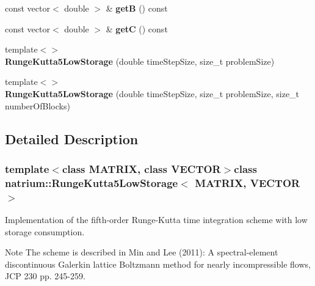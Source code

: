 \begin{DoxyCompactItemize}
\item 
\hypertarget{classnatrium_1_1RungeKutta5LowStorage_ac866c3f75f850ab90b70b3eaedd3cc3c}{const vector$<$ double $>$ \& {\bfseries get\-B} () const }\label{classnatrium_1_1RungeKutta5LowStorage_ac866c3f75f850ab90b70b3eaedd3cc3c}

\item 
\hypertarget{classnatrium_1_1RungeKutta5LowStorage_a0b747cec432de72544b82b5033eb8211}{const vector$<$ double $>$ \& {\bfseries get\-C} () const }\label{classnatrium_1_1RungeKutta5LowStorage_a0b747cec432de72544b82b5033eb8211}

\item 
\hypertarget{classnatrium_1_1RungeKutta5LowStorage_ae505b2f0b97b6237e8e81caebe3e1841}{{\footnotesize template$<$$>$ }\\{\bfseries Runge\-Kutta5\-Low\-Storage} (double time\-Step\-Size, size\-\_\-t problem\-Size)}\label{classnatrium_1_1RungeKutta5LowStorage_ae505b2f0b97b6237e8e81caebe3e1841}

\item 
\hypertarget{classnatrium_1_1RungeKutta5LowStorage_a2f6e627cc0a1463654a7f863f099d1a3}{{\footnotesize template$<$$>$ }\\{\bfseries Runge\-Kutta5\-Low\-Storage} (double time\-Step\-Size, size\-\_\-t problem\-Size, size\-\_\-t number\-Of\-Blocks)}\label{classnatrium_1_1RungeKutta5LowStorage_a2f6e627cc0a1463654a7f863f099d1a3}

\end{DoxyCompactItemize}


\subsection{Detailed Description}
\subsubsection*{template$<$class M\-A\-T\-R\-I\-X, class V\-E\-C\-T\-O\-R$>$class natrium\-::\-Runge\-Kutta5\-Low\-Storage$<$ M\-A\-T\-R\-I\-X, V\-E\-C\-T\-O\-R $>$}

Implementation of the fifth-\/order Runge-\/\-Kutta time integration scheme with low storage consumption. 

\begin{DoxyNote}{Note}
The scheme is described in Min and Lee (2011)\-: A spectral-\/element discontinuous Galerkin lattice Boltzmann method for nearly incompressible flows, J\-C\-P 230 pp. 245-\/259. 
\end{DoxyNote}


